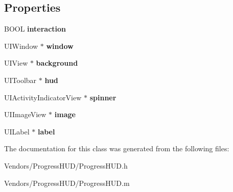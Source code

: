 \subsection*{Properties}
\begin{DoxyCompactItemize}
\item 
\hypertarget{interface_progress_h_u_d_a1f8f320fdc4ae17293e1bd0423278204}{}B\+O\+O\+L {\bfseries interaction}\label{interface_progress_h_u_d_a1f8f320fdc4ae17293e1bd0423278204}

\item 
\hypertarget{interface_progress_h_u_d_a4682cb0aadc7d9daed7eac2db951ad2f}{}U\+I\+Window $\ast$ {\bfseries window}\label{interface_progress_h_u_d_a4682cb0aadc7d9daed7eac2db951ad2f}

\item 
\hypertarget{interface_progress_h_u_d_adec0be983088fa4fabee42a06db7f776}{}U\+I\+View $\ast$ {\bfseries background}\label{interface_progress_h_u_d_adec0be983088fa4fabee42a06db7f776}

\item 
\hypertarget{interface_progress_h_u_d_a3a4d1a66f28f6d350d80a23c4f013232}{}U\+I\+Toolbar $\ast$ {\bfseries hud}\label{interface_progress_h_u_d_a3a4d1a66f28f6d350d80a23c4f013232}

\item 
\hypertarget{interface_progress_h_u_d_a388f0d3ab0737bb346ab26894e0bea7a}{}U\+I\+Activity\+Indicator\+View $\ast$ {\bfseries spinner}\label{interface_progress_h_u_d_a388f0d3ab0737bb346ab26894e0bea7a}

\item 
\hypertarget{interface_progress_h_u_d_a00a6d78eeedad716b5e522b0072be5dd}{}U\+I\+Image\+View $\ast$ {\bfseries image}\label{interface_progress_h_u_d_a00a6d78eeedad716b5e522b0072be5dd}

\item 
\hypertarget{interface_progress_h_u_d_a6d047d83e04b41b3156711865979c78c}{}U\+I\+Label $\ast$ {\bfseries label}\label{interface_progress_h_u_d_a6d047d83e04b41b3156711865979c78c}

\end{DoxyCompactItemize}


The documentation for this class was generated from the following files\+:\begin{DoxyCompactItemize}
\item 
Vendors/\+Progress\+H\+U\+D/Progress\+H\+U\+D.\+h\item 
Vendors/\+Progress\+H\+U\+D/Progress\+H\+U\+D.\+m\end{DoxyCompactItemize}
